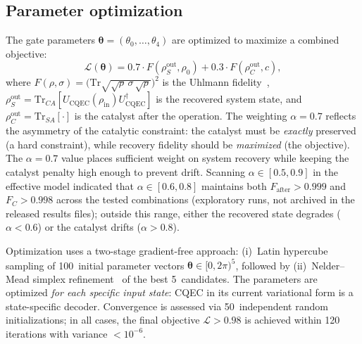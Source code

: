 \documentclass[pra,twocolumn,superscriptaddress,longbibliography,floatfix]{revtex4-2}
\begin{document}
\subsection{Parameter optimization}
\label{sec:optimization}

The gate parameters $\boldsymbol{\theta} = (\theta_0, \ldots, \theta_4)$ are optimized to maximize a combined objective:
\begin{equation}
\mathcal{L}(\boldsymbol{\theta}) = 0.7 \cdot F(\rho_S^\mathrm{out}, \rho_0) + 0.3 \cdot F(\rho_C^\mathrm{out}, c),
\label{eq:objective}
\end{equation}
where $F(\rho, \sigma) = \bigl(\mathrm{Tr}\sqrt{\sqrt{\rho}\,\sigma\,\sqrt{\rho}}\bigr)^2$ is the Uhlmann fidelity~\cite{Jozsa1994}, $\rho_S^\mathrm{out} = \mathrm{Tr}_{CA}[U_\mathrm{CQEC}(\rho_\mathrm{in})U_\mathrm{CQEC}^\dagger]$ is the recovered system state, and $\rho_C^\mathrm{out} = \mathrm{Tr}_{SA}[\cdot]$ is the catalyst after the operation.
The weighting $\alpha = 0.7$ reflects the asymmetry of the catalytic constraint: the catalyst must be \emph{exactly} preserved (a hard constraint), while recovery fidelity should be \emph{maximized} (the objective).
The $\alpha = 0.7$ value places sufficient weight on system recovery while keeping the catalyst penalty high enough to prevent drift.
Scanning $\alpha \in [0.5, 0.9]$ in the effective model indicated that $\alpha \in [0.6, 0.8]$ maintains both $F_\mathrm{after} > 0.999$ and $F_C > 0.998$ across the tested combinations (exploratory runs, not archived in the released results files); outside this range, either the recovered state degrades ($\alpha < 0.6$) or the catalyst drifts ($\alpha > 0.8$).

Optimization uses a two-stage gradient-free approach: (i)~Latin hypercube sampling of 100~initial parameter vectors $\boldsymbol{\theta} \in [0, 2\pi)^5$, followed by (ii)~Nelder--Mead simplex refinement~\cite{NelderMead1965} of the best 5~candidates.
The parameters are optimized \emph{for each specific input state}: CQEC in its current variational form is a state-specific decoder.
Convergence is assessed via 50~independent random initializations; in all cases, the final objective $\mathcal{L} > 0.98$ is achieved within 120 iterations with variance $< 10^{-6}$.
\end{document}

